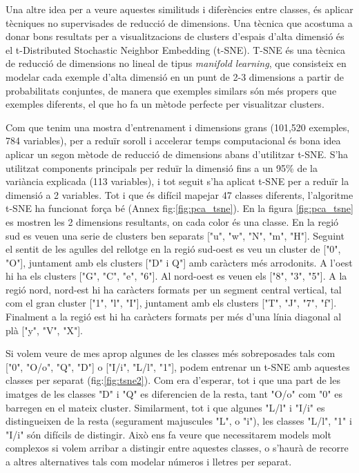 \documentclass[12pt, spanish]{article}
\begin{document}
Una altre idea per a veure aquestes similituds i diferències entre classes, és aplicar tècniques no supervisades de reducció de dimensions. Una tècnica que acostuma a donar bons resultats per a visualitzacions de clusters d'espais d'alta dimensió és el t-Distributed Stochastic Neighbor Embedding (t-SNE). T-SNE és una tècnica de reducció de dimensions no lineal de tipus \textit{manifold learning}, que consisteix en modelar cada exemple d'alta dimensió en un punt de 2-3 dimensions a partir de probabilitats conjuntes, de manera que exemples similars són més propers que exemples diferents, el que ho fa un mètode perfecte per visualitzar clusters.

Com que tenim una mostra d'entrenament i dimensions grans (101,520 exemples, 784 variables), per a reduïr soroll i accelerar temps computacional és bona idea aplicar un segon mètode de reducció de dimensions abans d'utilitzar t-SNE. S'ha utilitzat components principals per reduïr la dimensió fins a un 95\% de la variància explicada (113 variables), i tot seguit s'ha aplicat t-SNE per a reduïr la dimensió a 2 variables. Tot i que és difícil mapejar 47 classes diferents, l'algoritme t-SNE ha funcionat força bé (Annex fig:\ref{fig:pca_tsne}). En la figura \ref{fig:pca_tsne} es mostren les 2 dimensions resultants, on cada color és una classe. En la regió sud es veuen una serie de clusters ben separats ["u", "w", "N", "m", "H"]. Seguint el sentit de les agulles del rellotge en la regió sud-oest es veu un cluster de ["0", "O"], juntament amb els clusters ["D" i Q"] amb caràcters més arrodonits. A l'oest hi ha els clusters ["G", "C", "e", "6"]. Al nord-oest es veuen els ["8", "3", "5"]. A la regió nord, nord-est hi ha caràcters formats per un segment central vertical, tal com el gran cluster ["1", "l", "I"], juntament amb els clusters ["T", "J", "7", "f"]. Finalment a la regió est hi ha caràcters formats per més d'una línia diagonal al plà ["y", "V", "X"]. 

Si volem veure de mes aprop algunes de les classes més sobreposades tals com ["0", "O/o", "Q", "D"] o ["I/i", "L/l", "1"], podem entrenar un t-SNE amb aquestes classes per separat (fig:\ref{fig:tsne2}). Com era d'esperar, tot i que una part de les imatges de les classes "D" i "Q" es diferencien de la resta, tant "O/o" com "0" es barregen en el mateix cluster. Similarment, tot i que algunes "L/l" i "I/i" es distingueixen de la resta (segurament majuscules "L", o "i"), les classes "L/l", "1" i "I/i" són difícils de distingir. Això ens fa veure que necessitarem models molt complexos si volem arribar a distingir entre aquestes classes, o s'haurà de recorre a altres alternatives tals com modelar números i lletres per separat.
\end{document}
